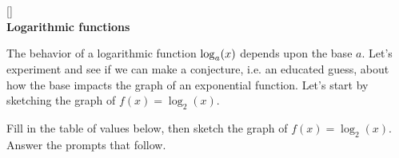 \documentclass[10pt]{article}
\begin{document}
~\\\\
[]{
{\bf {}} 
}{
{\bf {}}
}
\\
\newpage
{\bf Logarithmic functions}

The behavior of a logarithmic function $\displaystyle \log_a(x)$  depends upon  the base $a$. Let's experiment and see if we can make a conjecture, i.e. an educated guess, about how the base impacts the graph of an exponential function. Let's start by sketching the graph of $f(x)=\log_2(x)$.

 Fill in the table of values below, then sketch the graph of $f(x)=\log_2(x)$. Answer the prompts that follow.
\end{document}
